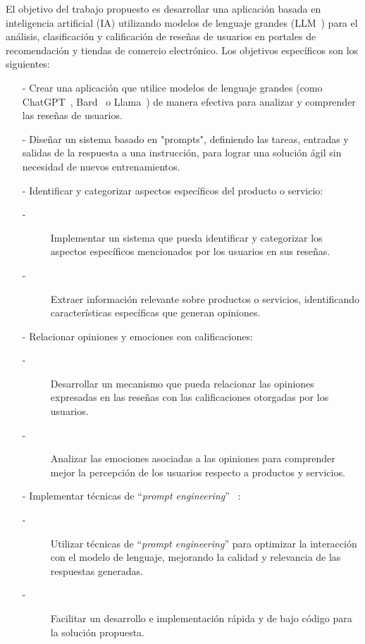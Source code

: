 
El objetivo del trabajo propuesto es desarrollar una aplicación 
basada en inteligencia artificial (IA) utilizando modelos de lenguaje grandes (LLM~\cite{mirchandani2023large}) 
para el análisis, clasificación y calificación de reseñas de usuarios en portales 
de recomendación y tiendas de comercio electrónico. 
Los objetivos específicos son los siguientes:
\begin{itemize}
    \item[-] Crear una aplicación que utilice modelos de lenguaje grandes (como ChatGPT~\cite{chatgpt1}, Bard~\cite{googlebard1} o Llama~\cite{metallamaLM}) 
    de manera efectiva para analizar y comprender las reseñas de usuarios. 
    \item[-] Diseñar un sistema basado en "prompts", definiendo las tareas, entradas y 
    salidas de la respuesta a una instrucción, para lograr una solución 
    ágil sin necesidad de nuevos entrenamientos.
    \item[-] Identificar y categorizar aspectos específicos del producto o servicio:
    \begin{description}
        \item[-] Implementar un sistema que pueda identificar y categorizar 
    los aspectos específicos mencionados por los usuarios en sus reseñas.
        \item[-] Extraer información relevante sobre productos o servicios, 
    identificando características específicas que generan opiniones.
    \end{description}
    \item[-] Relacionar opiniones y emociones con calificaciones:
    \begin{description}
        \item[-] Desarrollar un mecanismo que pueda relacionar las opiniones expresadas 
        en las reseñas con las calificaciones otorgadas por los usuarios.
        \item[-] Analizar las emociones asociadas a las opiniones para comprender 
        mejor la percepción de los usuarios respecto a productos y servicios.
    \end{description}
    \item[-] Implementar técnicas de ``\emph{prompt engineering}'' ~\cite{white2023prompt}:
    \begin{description}
        \item[-] Utilizar técnicas de ``\emph{prompt engineering}'' para optimizar la 
        interacción con el modelo de lenguaje, mejorando la calidad y 
        relevancia de las respuestas generadas.
        \item[-] Facilitar un desarrollo e implementación rápida y de bajo código para la solución propuesta. 
    \end{description}
        
\end{itemize}

